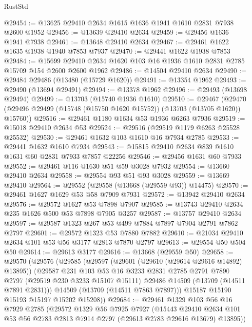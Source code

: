 \begin{lexlean}{RustStd}
\begin{coremodule}
@29454 := @13625 @29410 @2634 @1615 @1636 @1941 @1610 @2831 @7938 @2600 @1952
@29456 := @13639 @29410 @2634
@29459 := @29456 @1636 @1941 @7938
@29461 := @13648 @29410 @2634
@29467 := @29461 @1622 @1635 @1938 @1940 @7853 @7937
@29470 := @29441 @1622 @1938 @7853
@29484 := @15699 @29410 @2634 @1620 @103 @16 @1936 @1610 @2831 @2785 @15709 @154 @2600 @2600 @1962
@29486 := @14504 @29410 @2634
@29490 := @29484 @29486 (@13480 (@15729 @1620))
@29491 := @13354 @1962
@29493 := @29490 (@13694 @29491)
@29494 := @13378 @1962
@29496 := @29493 (@13698 @29494)
@29499 := @13703 (@15740 @1936 @1610)
@29510 := @29467
    (@29470 (@29496 @29499 (@15748 (@15750 @1620 @15752)) (@13703 (@13705 @1620)) @15760))
@29516 := @29461 @1180 @1634 @53 @1936 @6263 @7936
@29519 := @15018 @29410 @2634 @53
@29524 := @29516 (@29519 @1179 @6263 @25528 @25532)
@29530 := @29461 @1632 @103 @1610 @16 @7934 @2785
@29533 := @29441 @1632 @1610 @7934
@29543 := @15815 @29410 @2634 @839 @1610 @1631 @60 @2831 @7933 @7857 @22256
@29546 := @29456 @1631 @60 @7933
@29552 := @29461 @116 @1630 @51 @59 @3028 @7932
@29554 := @13660 @29410 @2634
@29558 := @29554 @93 @51 @93 @3028
@29559 := @13669 @29410
@29564 := @29552 (@29558 (@13668 (@29559 @93)) @14475)
@29570 := @29461 @1627 @1629 @53 @58 @7909 @7931
@29572 := @13942 @29410 @2634
@29576 := @29572 @1627 @53 @7898 @7907
@29585 := @13743 @29410 @2634 @235 @1626 @500 @53 @7898 @7905 @3257
@29587 := @13757 @29410 @2634
@29597 := @29587 @1323 @267 @53 @499 @7884 @7897 @7904 @2791 @7862 @2797
@29601 := @29572 @1323 @53 @7880 @7882
@29610 := @21034 @29410 @2634 @101 @53 @56 @3177 @2813 @7870 @2797
@29613 := @29554 @50 @504 @50
@29614 := @29613 @3177
@29616 := @13668 (@29559 @50)
@29658 := @29570
    (@29576
      (@29585
        (@29597
          (@29601 (@29610 (@29614 @29616 @14892) @13895))
          (@29587
            @231
            @103
            @53
            @16
            @3233
            @2831
            @2785
            @2791
            @7890
            @2797
            (@29519 @230 @3233 @15107 @15111)
            @29486
            @14509
            (@13709 (@14511 @7891 @2831)))
          @14509
          (@13709 (@14511 @7863 @7897)))
        @15187
        @15190
        @15193
        @15197
        @15202
        @15208))
@29684 := @29461
    @1329
    @103
    @56
    @16
    @7929
    @2785
    (@29572
      @1329
      @56
      @7925
      @7927
      (@15443
        @29410
        @2634
        @101
        @53
        @56
        @2783
        @2813
        @7914
        @2797
        (@29613 @2783 @29616 @13679)
        @13895))

\end{coremodule}
\end{lexlean}

